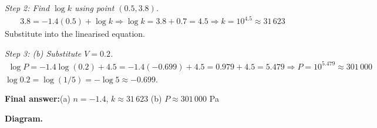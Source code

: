 \documentclass[11pt]{article}
\begin{document}
\textit{Step 2: Find \( \log k \) using point \( (0.5, 3.8) \).}
\[\begin{gathered}
3.8 = -1.4(0.5) + \log k \Rightarrow \log k = 3.8 + 0.7 = 4.5 \Rightarrow k = 10^{4.5} \approx 31\,623
\end{gathered}\]
Substitute into the linearised equation.

\textit{Step 3: (b) Substitute \( V = 0.2 \).}
\[\begin{gathered}
\log P = -1.4\log(0.2) + 4.5 = -1.4(-0.699) + 4.5 = 0.979 + 4.5 = 5.479 \Rightarrow P = 10^{5.479} \approx 301\,000
\end{gathered}\]
\( \log 0.2 = \log(1/5) = -\log 5 \approx -0.699 \).

\begin{answerbox}
\textbf{Final answer:}\quad (a) \(\displaystyle  n = -1.4 \), \(\displaystyle  k \approx 31\,623 \) \quad  (b) \(\displaystyle  P \approx 301\,000 \) Pa
\end{answerbox}
\textbf{Diagram.}
\end{document}
